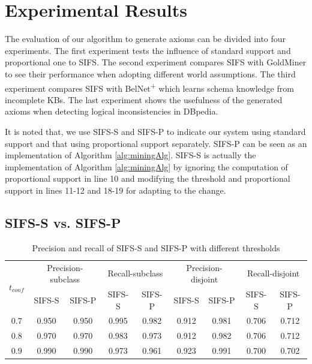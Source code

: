 \section{Experimental Results}\label{sec:res}

The evaluation of our algorithm to generate axioms can be divided into four experiments.  The first experiment tests the influence of standard support and proportional one to SIFS. The second experiment compares SIFS with GoldMiner to see their performance when adopting different world assumptions. The third experiment compares SIFS with BelNet\textsuperscript{+} which learns schema knowledge from incomplete KBs. The last experiment shows the usefulness of the generated axioms when detecting logical inconsistencies in DBpedia.

It is noted that, we use SIFS-S and SIFS-P to indicate our system using standard support and that using proportional support separately. SIFS-P can be seen as an implementation of Algorithm \ref{alg:miningAlg}. SIFS-S is actually the implementation of Algorithm \ref{alg:miningAlg} by ignoring the computation of proportional support in line 10 and modifying the threshold and proportional support in lines 11-12 and 18-19 for adapting to the change.

\subsection{SIFS-S vs. SIFS-P}
\begin{table}[t]
\centering
\begin{footnotesize}
\begin{tabular}{|c|c|c|c|c|c|c|c|c|}
\hline
\multirow{2}{1cm}{$t_{conf}$}&\multicolumn{2}{|c|}{Precision-subclass} & \multicolumn{2}{|c|}{Recall-subclass} & \multicolumn{2}{|c|}{Precision-disjoint} & \multicolumn{2}{|c|}{Recall-disjoint}\\
 &SIFS-S&SIFS-P&SIFS-S&SIFS-P&SIFS-S&SIFS-P&SIFS-S&SIFS-P\\
\hline
0.7&0.950&0.950&0.995&0.982&0.912&0.981&0.706&0.712\\
0.8&0.970&0.970&0.983&0.973&0.912&0.982&0.706&0.712\\
0.9&0.990&0.990&0.973&0.961&0.923&0.991&0.700&0.702\\
\hline
\end{tabular}
\end{footnotesize}
\caption{Precision and recall of SIFS-S and SIFS-P with different thresholds}
\label{tab:SIFS-SvsP}
\end{table}

